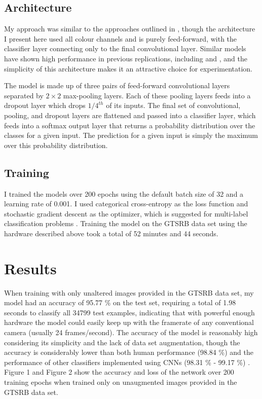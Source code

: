 \documentclass[letterpaper,twocolumn,10pt]{article}
\begin{document}
\subsection{Architecture}

My approach was similar to the approaches outlined in \cite{sermanet_convolutional_2012, sermanet_traffic_2011}, though the architecture I present here used all colour channels and is purely feed-forward, with the classifier layer connecting only to the final convolutional layer. Similar models have shown high performance in previous replications, including \cite{keras_traffic} and \cite{tensorflow_traffic}, and the simplicity of this architecture makes it an attractive choice for experimentation.

The model is made up of three pairs of feed-forward convolutional layers separated by $2 \times 2$ max-pooling layers. Each of these pooling layers feeds into a dropout layer which drops $1/4^{th}$ of its inputs. The final set of convolutional, pooling, and dropout layers are flattened and passed into a classifier layer, which feeds into a softmax output layer that returns a probability distribution over the classes for a given input. The prediction for a given input is simply the maximum over this probability distribution.

\subsection{Training}

I trained the models over 200 epochs using the default batch size of 32 and a learning rate of 0.001. I used categorical cross-entropy as the loss function and stochastic gradient descent as the optimizer, which is suggested for multi-label classification problems \cite{lasagne_loss}. Training the model on the GTSRB data set using the hardware described above took a total of 52 minutes and 44 seconds.

\section{Results}

When training with only unaltered images provided in the GTSRB data set, my model had an accuracy of 95.77 \% on the test set, requiring a total of 1.98 seconds to classify all 34799 test examples, indicating that with powerful enough hardware the model could easily keep up with the framerate of any conventional camera (usually 24 frames/second). The accuracy of the model is reasonably high considering its simplicity and the lack of data set augmentation, though the accuracy is considerably lower than both human performance (98.84 \%) and the performance of other classifiers implemented using CNNs (98.31 \% - 99.17 \%) \cite{sermanet_convolutional_2012, sermanet_traffic_2011, stallkamp_german_2011, stallkamp_man_2012}. Figure 1 and Figure 2 show the accuracy and loss of the network over 200 training epochs when trained only on unaugmented images provided in the GTSRB data set.
\end{document}
